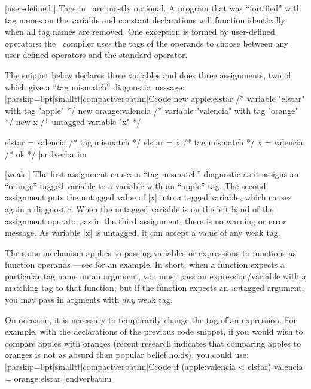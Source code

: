 [user-defined \midtilde]
\noindent{}%
Tags in \Small\ are mostly optional. A program that was ``fortified'' with tag
names on the variable and constant declarations will function identically when
all tag names are removed. One exception is formed by user-defined operators:
the \Small\ compiler uses the tags of the operands to choose between any user-defined
operators and the standard operator.

\goodbreak
The snippet below declares three variables and does three assignments, two of
which give a ``tag mismatch'' diagnostic message:
\listingx\verbatim|parskip=0pt|smalltt|compactverbatim|Ccode
new apple:elstar        /* variable "elstar" with tag "apple" */
new orange:valencia     /* variable "valencia" with tag "orange" */
new x                   /* untagged variable "x" */

elstar = valencia       /* tag mismatch */
elstar = x              /* tag mismatch */
x = valencia            /* ok */
|endverbatim\endlistingx

[weak \midtilde]
\noindent{}%
The first assignment causes a ``tag mismatch'' diagnostic as it assigns an
``orange'' tagged variable to a variable with an ``apple'' tag. The second
assignment puts the untagged value of |x| into a tagged variable, which causes
again a diagnostic. When the untagged variable is on the left hand of the
assignment operator, as in the third assignment, there is no warning or
error message. As variable |x| is untagged, it can accept a value of any weak
tag.

The same mechanism applies to passing variables or expressions to functions
as function operands ---see  for an example. In short,
when a function expects a particular tag name on an argument, you must pass an
expression\slash variable with a matching tag to that function; but if the
function expects an {\it un\/}tagged argument, you may pass in argments with
{\it any\/} weak tag.

On occasion, it is necessary to temporarily change the tag of an expression.
For example, with the declarations of the previous code snippet, if you would
wish to compare apples with oranges (recent research indicates that comparing
apples to oranges is not as absurd than popular belief holds), you could use:
\listingx\verbatim|parskip=0pt|smalltt|compactverbatim|Ccode
if (apple:valencia < elstar)
    valencia = orange:elstar
|endverbatim\endlistingx

